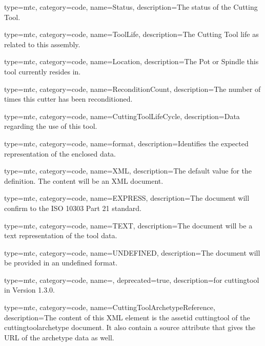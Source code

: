 {
  type=mtc,
  category=code,
  name={Status},
  description={The status of the Cutting Tool.}
}


{
  type=mtc,
  category=code,
  name={ToolLife},
  description={The Cutting Tool life as related to this assembly.}
}


{
  type=mtc,
  category=code,
  name={Location},
  description={The Pot or Spindle this tool currently resides in.}
}


{
  type=mtc,
  category=code,
  name={ReconditionCount},
  description={The number of times this cutter has been reconditioned.}
}


{
  type=mtc,
  category=code,
  name={CuttingToolLifeCycle},
  description={Data regarding the use of this tool.}
}


{
  type=mtc,
  category=code,
  name={format},
  description={Identifies the expected representation of the enclosed data.}
}


{
  type=mtc,
  category=code,
  name={XML},
  description={The default value for the definition. The content will be an XML document.}
}


{
  type=mtc,
  category=code,
  name={EXPRESS},
  description={The document will confirm to the ISO 10303 Part 21 standard.}
}


{
  type=mtc,
  category=code,
  name={TEXT},
  description={The document will be a text representation of the tool data.}
}


{
  type=mtc,
  category=code,
  name={UNDEFINED},
  description={The document will be provided in an undefined format.}
}


{
  type=mtc,
  category=code,
  name=,
  deprecated={true},
  description={\DEPRECATED for \gls{cuttingtool} in Version 1.3.0.   \newline {}}
}


{
  type=mtc,
  category=code,
  name={CuttingToolArchetypeReference},
  description={The content of this XML element is the \gls{assetid cuttingtool} of the \gls{cuttingtoolarchetype} document. It \MAY also contain a source attribute that gives the URL of the archetype data as well.}
}


